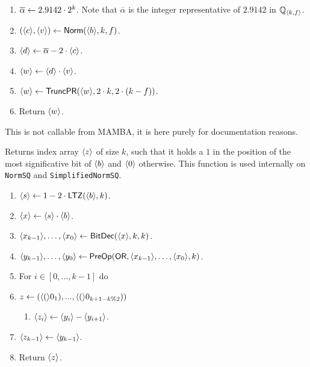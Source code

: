 \begin{enumerate}
\item $\overline{\alpha} \leftarrow 2.9142 \cdot 2^k$.
	Note that $\overline{\alpha}$ is the integer representative of $2.9142$ in ${\mathbb{Q}}_{\langle k, f \rangle}$.
\item $(\langle c \rangle,\langle v \rangle) \leftarrow \mathsf{Norm}(\langle b \rangle,k,f)$.
\item $\langle d \rangle \leftarrow \overline{\alpha} - 2 \cdot \langle c \rangle$.
\item $\langle w \rangle \leftarrow \langle d \rangle \cdot \langle v \rangle$.
\item $\langle w \rangle \leftarrow \mathsf{TruncPR}(\langle w \rangle,2 \cdot k,2 \cdot (k-f))$.
\item Return $\langle w \rangle$.
\end{enumerate}
This is not callable from MAMBA, it is here purely for documentation reasons.

Returns index array $\langle z \rangle$ of size $k$, such that it holds a $1$ in the position of the most significative bit of $\langle b \rangle$ and $\langle 0 \rangle$ otherwise. This function is used internally on \verb|NormSQ| and \verb|SimplifiedNormSQ|.
\begin{enumerate}

\item $\langle s \rangle \leftarrow 1-2 \cdot \mathsf{LTZ}(\langle b \rangle,k)$.
\item $\langle x \rangle \leftarrow \langle s \rangle \cdot \langle b \rangle$.
\item $\langle x_{k-1} \rangle,\ldots,\langle x_0 \rangle \leftarrow \mathsf{BitDec}(\langle x \rangle,k,k)$.
\item $\langle y_{k-1} \rangle,\ldots,\langle y_0 \rangle \leftarrow \mathsf{PreOp}(\mathsf{OR},\langle x_{k-1} \rangle,\ldots,\langle x_0 \rangle,k)$.
\item For $i \in [0,\ldots,k-1]$ do 
\item $z \leftarrow (\langle ( \rangle0_{1}),...,\langle ( \rangle0_{k + 1 - k \% 2}))$
\begin{enumerate}
  \item $\langle z_i \rangle \leftarrow \langle y_i \rangle-\langle y_{i+1} \rangle$.
\end{enumerate}
\item $\langle z_{k-1} \rangle \leftarrow \langle y_{k-1} \rangle$.
\item Return $\langle z \rangle$.
\end{enumerate}

